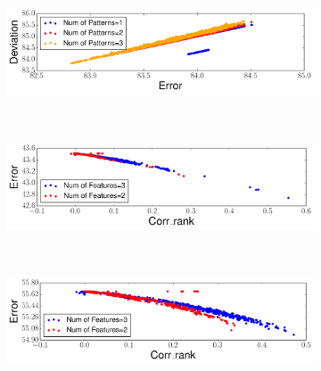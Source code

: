 \begin{figure}[h!]
\begin{subfigure}[b]{0.485\textwidth}
        \centering
        \includegraphics[width=\textwidth]{QueryLogSummarization/graphics/ErrorCapturesDeviation_PocketData.pdf}
        \label{fig:errorcapturesdeviation_pocketdata}
    \end{subfigure}
    ~
     \begin{subfigure}[b]{0.48\textwidth}
        \centering     \includegraphics[width=\textwidth]{QueryLogSummarization/graphics/ErrorCapturesCorrelation_BankData.pdf}
        \label{fig:errorcapturescorrelation_bankdata}
\end{subfigure}
    ~
     \begin{subfigure}[b]{0.48\textwidth}
        \centering     \includegraphics[width=\textwidth]{QueryLogSummarization/graphics/ErrorCapturesCorrelation_PocketData.pdf}
        \label{fig:errorcapturescorrelation_pocketdata}
\end{subfigure}
    
\label{fig:validatingencodingerror}
\trimfigurewhitespace
\end{figure}

